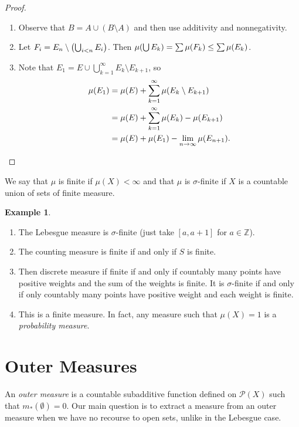 \documentclass[leqno, openany]{memoir}
\theoremstyle{definition}
\newtheorem{exm}[thm]{Example}
\theoremstyle{remark}
\theoremstyle{plain}
\theoremstyle{definition}
\theoremstyle{remark}
\newcommand{\Z}{\mathbb{Z}}
\newcommand{\mc}[1]{\mathcal{#1}}
\begin{document}
\begin{proof}
    \begin{enumerate}
        \item Observe that $B = A \cup (B \setminus A)$ and then use additivity and nonnegativity.
        \item Let $F_i = E_n \setminus \qty(\bigcup_{i<n} E_i)$. Then $\mu\qty(\bigcup E_k) = \sum \mu(F_k) \leq \sum \mu(E_k)$.
        \item Note that $E_1 = E \cup \bigcup_{k=1}^{\infty} E_k \setminus E_{k+1}$, so 
            \begin{align*}
                \mu(E_1) &= \mu(E) + \sum_{k=1}^{\infty} \mu(E_k \setminus E_{k+1}) \\
                         &= \mu(E) + \sum_{k=1}^{\infty} \mu(E_k) - \mu(E_{k+1}) \\
                         &= \mu(E) + \mu(E_1) - \lim_{n \to \infty} \mu(E_{n+1}). \qedhere
            \end{align*}
    \end{enumerate}
\end{proof}

We say that $\mu$ is finite if $\mu(X) < \infty$ and that $\mu$ is $\sigma$-finite if $X$ is a countable union of sets of finite measure.

\begin{exm}
    \begin{enumerate}
        \item The Lebesgue measure is $\sigma$-finite (just take $[a,a+1]$ for $a \in \Z$).
        \item The counting measure is finite if and only if $S$ is finite.
        \item Then discrete measure if finite if and only if countably many points have positive weights and the sum of the weights is finite. It is $\sigma$-finite if and only if only countably many points have positive weight and each weight is finite.
        \item This is a finite measure. In fact, any measure such that $\mu(X) = 1$ is a \textit{probability measure}.
    \end{enumerate}
\end{exm}

\section{Outer Measures}%
\label{sec:outer_measures}

An \textit{outer measure} is a countable subadditive function defined on $\mc{P}(X)$ such that $m_*(\emptyset) = 0$. Our main question is to extract a measure from an outer measure when we have no recourse to open sets, unlike in the Lebesgue case.
\end{document}
